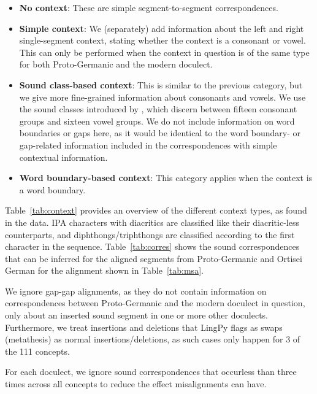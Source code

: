 \documentclass[a4paper]{article}
\begin{document}
\begin{itemize}
\item
\textbf{No context}:
These are simple segment-to-segment correspondences.

\item
\textbf{Simple context}:
We (separately) add information about the
left and right single-segment context,
stating whether the context is a consonant or vowel. 
This can only be performed when the context in question is of
the same type for both Proto-Germanic and the modern doculect.

\item
\textbf{Sound class-based context}:
This is similar to the previous category,
but we give more fine-grained information about consonants and vowels.
We use the sound classes introduced by \citet{list2012sca},
which discern between fifteen consonant groups and sixteen vowel groups.
We do not include information on word boundaries or gaps here,
as it would be identical to the word boundary- or gap-related information
included in the correspondences with simple contextual information.

\item
\textbf{Word boundary-based context}:
This category applies when the context is a word boundary.

\end{itemize}

Table~\ref{tab:context} provides an overview
of the different context types, as found in the data.
IPA characters with diacritics are classified
like their diacritic-less counterparts,
and diphthongs/triphthongs are classified
according to the first character in the sequence.
Table~\ref{tab:corres} shows the sound correspondences
that can be inferred for the aligned segments
from Proto-Germanic and Ortisei German for the alignment
shown in Table~\ref{tab:msa}.

We ignore gap-gap alignments,
as they do not contain information on correspondences
between Proto-Germanic and the modern doculect in question,
only about an inserted sound segment in one or more other doculects.
Furthermore, we treat insertions and deletions
that LingPy flags as swaps (metathesis) as normal insertions/deletions,
as such cases only happen for 3 of the 111 concepts.

For each doculect, we ignore sound correspondences
that occurless than three times across all concepts
to reduce the effect misalignments can have. 
\end{document}
